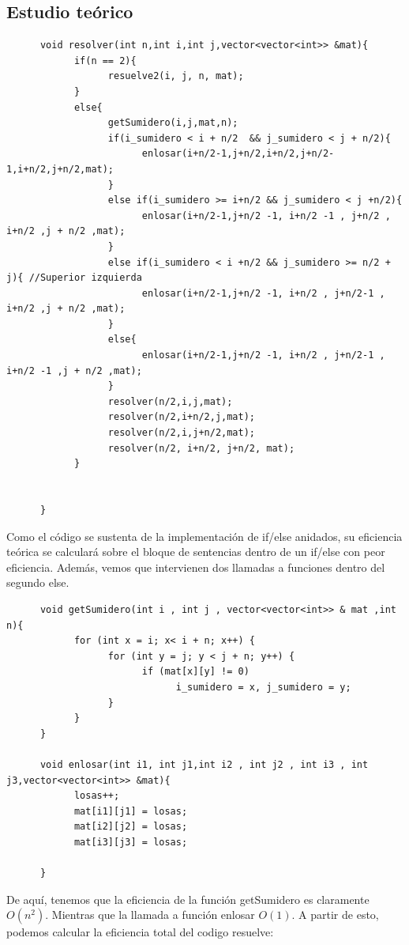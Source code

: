 \documentclass[11pt,openany]{book}
\begin{document}
\subsection{Estudio teórico}
\begin{lstlisting}
      void resolver(int n,int i,int j,vector<vector<int>> &mat){
            if(n == 2){
                  resuelve2(i, j, n, mat);
            }
            else{
                  getSumidero(i,j,mat,n);
                  if(i_sumidero < i + n/2  && j_sumidero < j + n/2){
                        enlosar(i+n/2-1,j+n/2,i+n/2,j+n/2-1,i+n/2,j+n/2,mat);
                  }
                  else if(i_sumidero >= i+n/2 && j_sumidero < j +n/2){ 
                        enlosar(i+n/2-1,j+n/2 -1, i+n/2 -1 , j+n/2 , i+n/2 ,j + n/2 ,mat);
                  }
                  else if(i_sumidero < i +n/2 && j_sumidero >= n/2 + j){ //Superior izquierda
                        enlosar(i+n/2-1,j+n/2 -1, i+n/2 , j+n/2-1 , i+n/2 ,j + n/2 ,mat);
                  }
                  else{
                        enlosar(i+n/2-1,j+n/2 -1, i+n/2 , j+n/2-1 , i+n/2 -1 ,j + n/2 ,mat);
                  }
                  resolver(n/2,i,j,mat);
                  resolver(n/2,i+n/2,j,mat);
                  resolver(n/2,i,j+n/2,mat);
                  resolver(n/2, i+n/2, j+n/2, mat);
            }


      }
\end{lstlisting}

Como el código se sustenta de la implementación de if/else anidados, su eficiencia teórica se calculará
sobre el bloque de sentencias dentro de un if/else con peor eficiencia. Además, vemos que intervienen 
dos llamadas a funciones dentro del segundo else.

\begin{lstlisting}
      void getSumidero(int i , int j , vector<vector<int>> & mat ,int n){
            for (int x = i; x< i + n; x++) {
                  for (int y = j; y < j + n; y++) {
                        if (mat[x][y] != 0)
                              i_sumidero = x, j_sumidero = y;
                  }   
            }
      }

      void enlosar(int i1, int j1,int i2 , int j2 , int i3 , int j3,vector<vector<int>> &mat){
            losas++;
            mat[i1][j1] = losas;
            mat[i2][j2] = losas;
            mat[i3][j3] = losas;

      }
\end{lstlisting}
De aquí, tenemos que la eficiencia de la función getSumidero es claramente $O(n^2)$. Mientras que la llamada
a función enlosar $O(1)$. A partir de esto, podemos calcular la eficiencia total del codigo resuelve:
\end{document}
